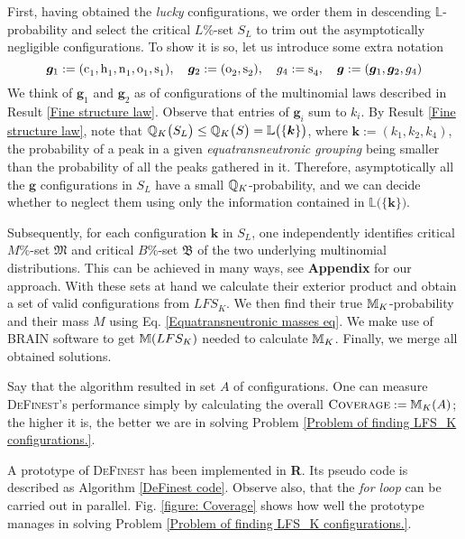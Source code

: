 First, having obtained the {\it lucky} configurations, we order them in descending $\mathbb{L}$-probability and select the critical $L\%$-set $S_L$ to trim out the asymptotically negligible configurations. To show it is so, let us introduce some extra notation
\begin{equation}
	\bm{g}_1 := (\cem{c_1}, \cem{h_1}, \cem{n_1}, \cem{o_1}, \cem{s_1} ), \quad
	\bm{g}_2 := (\cem{o_2}, \cem{s_2}), \quad
	g_4 := \cem{s_4}, \quad 
	\bm{g} := ( \bm{g}_1, \bm{g}_2, g_4)
\end{equation}
We think of $\bm{g}_1$ and $\bm{g}_2$ as of configurations of the multinomial laws described in Result \ref{Fine structure law}. Observe that entries of $\bm{g}_i$ sum to $k_i$. By Result \ref{Fine structure law}, note that $\mathbb{Q}_K \big( S_L \big) \leq \mathbb{Q}_K \big( S \big) = \mathbb{L}\big( \{ \bm{k} \} \big)$, where $\bm{k} := (k_1, k_2, k_4)$, the probability of a peak in a given {\it equatransneutronic grouping} being smaller than the probability of all the peaks gathered in it. Therefore, asymptotically all the $\bm{g}$ configurations in $S_L$ have a small $\mathbb{Q}_K$-probability, and we can decide whether to neglect them using only the information contained in $\mathbb{L}\big( \{ \bm{k} \} \big)$.

Subsequently, for each configuration $\bm{k}$ in $S_L$, one independently identifies critical $M\%$-set $\mathfrak{M}$ and critical $B\%$-set $\mathfrak{B}$ of the two underlying multinomial distributions. This can be achieved in many ways, see \textbf{Appendix} for our approach. With these sets at hand we calculate their exterior product and obtain a set of valid configurations from $LFS_K$. We then find their true $\mathbb{M}_K$-probability and their mass $M$ using Eq. \eqref{Equatransneutronic masses eq}. We make use of \textsc{BRAIN} \cite{Dittwald2013BRAIN} software to get $\mathbb{M}(LFS_K)$ needed to calculate $\mathbb{M}_K$. Finally, we merge all obtained solutions.

Say that the algorithm resulted in set $A$ of configurations. One can measure \textsc{DeFinest}'s performance simply by calculating the overall $\textsc{Coverage} := \mathbb{M}_K(A)$; the higher it is, the better we are in solving Problem \ref{Problem of finding LFS_K configurations.}.

A prototype of \textsc{DeFinest} has been implemented in \textbf{R}. Its pseudo code is described as Algorithm \ref{DeFinest code}. Observe also, that the {\it for loop} can be carried out in parallel. Fig. \ref{figure: Coverage} shows how well the prototype manages in solving Problem \ref{Problem of finding LFS_K configurations.}. 




